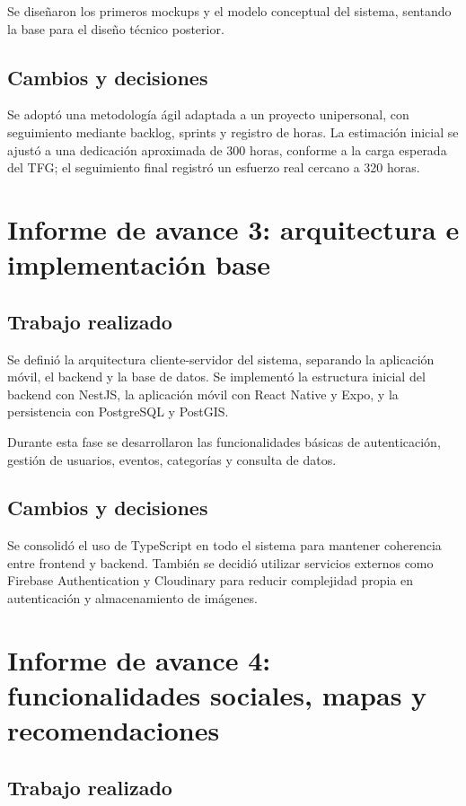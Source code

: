Se diseñaron los primeros mockups y el modelo conceptual del sistema, sentando la base para el diseño técnico posterior.

\subsection{Cambios y decisiones}

Se adoptó una metodología ágil adaptada a un proyecto unipersonal, con seguimiento mediante backlog, sprints y registro de horas. La estimación inicial se ajustó a una dedicación aproximada de 300 horas, conforme a la carga esperada del TFG; el seguimiento final registró un esfuerzo real cercano a 320 horas.

\section{Informe de avance 3: arquitectura e implementación base}

\subsection{Trabajo realizado}

Se definió la arquitectura cliente-servidor del sistema, separando la aplicación móvil, el backend y la base de datos. Se implementó la estructura inicial del backend con NestJS, la aplicación móvil con React Native y Expo, y la persistencia con PostgreSQL y PostGIS.

Durante esta fase se desarrollaron las funcionalidades básicas de autenticación, gestión de usuarios, eventos, categorías y consulta de datos.

\subsection{Cambios y decisiones}

Se consolidó el uso de TypeScript en todo el sistema para mantener coherencia entre frontend y backend. También se decidió utilizar servicios externos como Firebase Authentication y Cloudinary para reducir complejidad propia en autenticación y almacenamiento de imágenes.

\section{Informe de avance 4: funcionalidades sociales, mapas y recomendaciones}

\subsection{Trabajo realizado}

